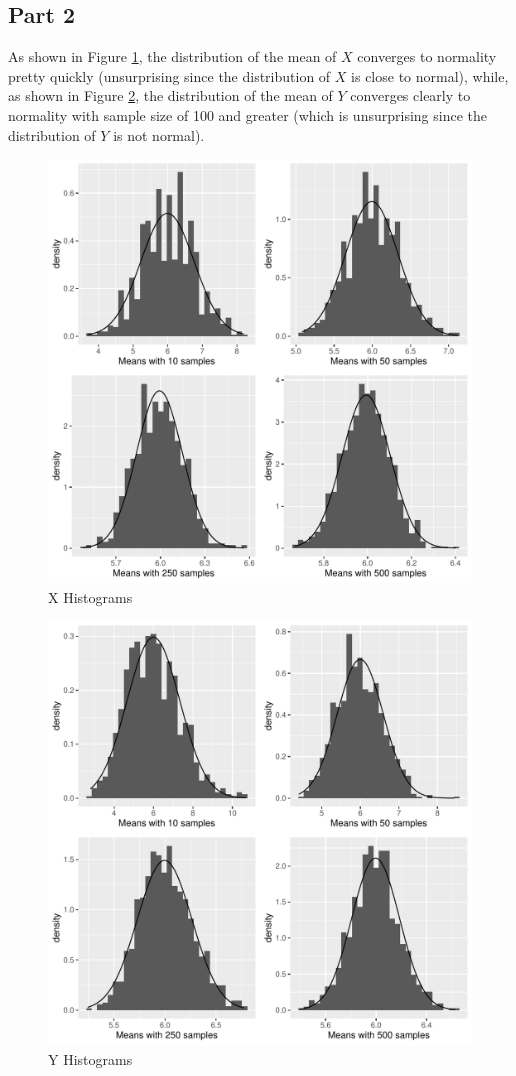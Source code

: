 \documentclass[12pt]{article}
\begin{document}
\subsection*{Part 2}

As shown in Figure \ref{fig:x_hists}, the distribution of the mean of $X$ converges to normality pretty quickly (unsurprising since the distribution of $X$ is close to normal), while, as shown in Figure \ref{fig:y_hists}, the distribution of the mean of $Y$ converges clearly to normality with sample size of 100 and greater (which is unsurprising since the distribution of $Y$ is not normal).

\begin{figure}[H]
\caption{X Histograms}
\label{fig:x_hists}
\centering
\includegraphics[width = .7\textwidth]{hw1_Xconv.pdf}
\end{figure}

\begin{figure}[H]
\caption{Y Histograms}
\label{fig:y_hists}
\centering
\includegraphics[width = .7\textwidth]{hw1_Yconv.pdf}
\end{figure}
\end{document}
